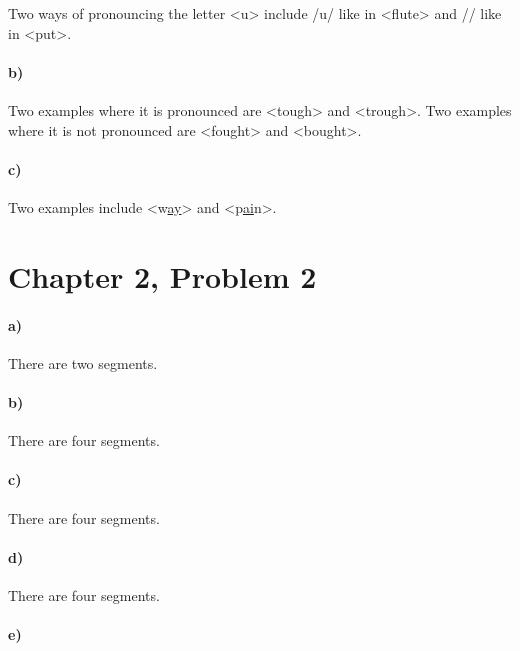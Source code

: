 \documentclass[12pt]{article}
\begin{document}
Two ways of pronouncing the letter \textless{}u\textgreater{} include /u/ like in \textless{}flute\textgreater{} and
/\textupsilon/ like in \textless{}put\textgreater{}.

\paragraph{b)}

Two examples where it is pronounced are \textless{}tough\textgreater{} and \textless{}trough\textgreater{}. Two examples
where it is not pronounced are \textless{}fought\textgreater{} and \textless{}bought\textgreater{}.

\paragraph{c)}

Two examples include \textless{}w\underline{ay}\textgreater{} and \textless{}p\underline{ai}n\textgreater{}.

\section*{Chapter 2, Problem 2}

\paragraph{a)}

There are two segments.

\paragraph{b)}

There are four segments.

\paragraph{c)}

There are four segments.

\paragraph{d)}

There are four segments.

\paragraph{e)}
\end{document}
